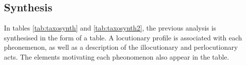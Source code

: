 		\subsection{Synthesis}
		
			In tables \ref{tab:taxosynth} and \ref{tab:taxosynth2}, the previous analysis is synthesised in the form of a table. A locutionary profile is associated with each pheonemenon, as well as a description of the illocutionary and perlocutionary acts. The elements motivating each pheonomenon also appear in the table.
		

